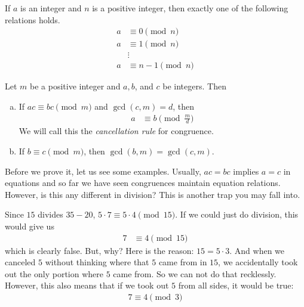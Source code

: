 \begin{proposition}
	If $a$ is an integer and $n$ is a positive integer, then exactly one of the following relations holds.
		\begin{align*}
			a &\equiv 0 \pmod n\\
			a &\equiv 1 \pmod n\\
	  &\vdots\\
			a &\equiv n-1 \pmod{n}
		\end{align*}
\end{proposition}


\begin{theorem}
	Let $m$ be a positive integer and $a, b$, and $c$ be integers. Then
	\begin{enumerate}[(a)]
		\item If $ac \equiv bc \pmod m$ and $\gcd(c,m)=d$, then
			\begin{align*}
			 a & \equiv b \pmod{\frac{m}{d}}
		 \end{align*}
		We will call this the \textit{cancellation rule} for congruence.
		\item If $b \equiv c \pmod m$, then $\gcd(b,m)=\gcd(c,m)$.
	\end{enumerate}
\end{theorem}
Before we prove it, let us see some examples. Usually, $ac=bc$ implies $a=c$ in equations and so far we have seen congruences maintain equation relations. However, is this any different in division? This is another trap you may fall into.

Since $15$ divides $35-20$, $5\cdot7\equiv5\cdot4\pmod{15}$. If we could just do division, this would give us
\begin{align*}
	7
		& \equiv4\pmod{15}
\end{align*}
which is clearly false. But, why? Here is the reason: $15=5\cdot3$. And when we canceled $5$ without thinking where that $5$ came from in $15$, we accidentally took out the only portion where $5$ came from. So we can not do that recklessly. However, this also means that if we took out $5$ from all sides, it would be true:
\begin{align*}
	7\equiv4\pmod{3}
\end{align*}

